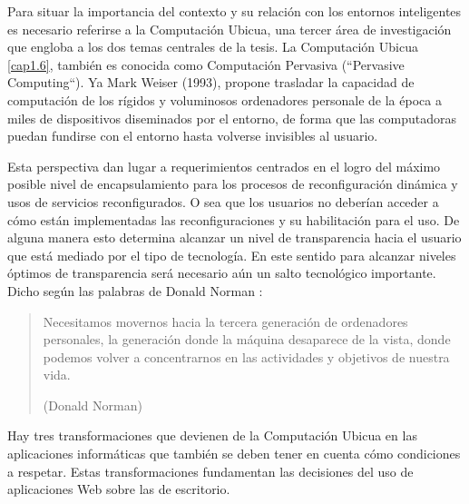 Para situar la importancia del contexto y su relación con los entornos
inteligentes es necesario referirse a la Computación Ubicua, una tercer área de
investigación que engloba a los dos temas centrales de la tesis. La Computación
Ubicua \ref{cap1.6}, también es conocida como Computación Pervasiva (``Pervasive
Computing``). Ya Mark Weiser (1993), propone trasladar la capacidad de
computación de
los rígidos y voluminosos ordenadores personale de la época a miles de dispositivos
diseminados por el entorno, de forma que las computadoras puedan fundirse con el
entorno hasta volverse invisibles al usuario.

Esta perspectiva dan lugar a requerimientos centrados en el logro del máximo
posible nivel de encapsulamiento para los procesos de reconfiguración
dinámica y usos de servicios reconfigurados. O sea que los usuarios no deberían
acceder a cómo están implementadas las reconfiguraciones y su habilitación para
el uso. De alguna manera esto determina alcanzar un nivel de transparencia hacia
el usuario que está mediado por el tipo de tecnología. En este sentido para
alcanzar niveles óptimos de transparencia será necesario aún un salto
tecnológico importante. Dicho según las palabras de Donald Norman
\cite{cap1.196}:

\begin{quote}
Necesitamos movernos hacia la tercera generación de ordenadores
personales, la generación donde la máquina desaparece de la vista,
donde podemos volver a concentrarnos en las actividades y objetivos
de nuestra vida.
\begin{flushright} (Donald Norman) \end{flushright}
\end{quote} 

Hay tres transformaciones que devienen de la Computación Ubicua en las
aplicaciones informáticas que también se deben tener en cuenta cómo
condiciones a respetar. Estas transformaciones fundamentan las decisiones del uso de
aplicaciones Web sobre las de escritorio.

